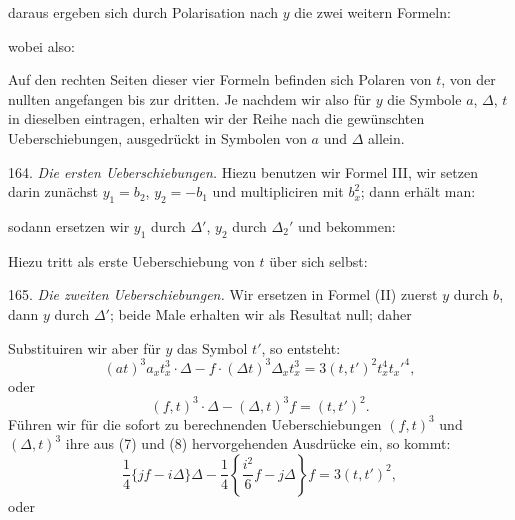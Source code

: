 daraus ergeben sich durch Polarisation nach $y$ die zwei weitern Formeln:





wobei also:


Auf den rechten Seiten dieser vier Formeln befinden sich Polaren von $t$, von der nullten angefangen bis zur dritten. Je nachdem wir also für $y$ die Symbole $a$, $\Delta$, $t$ in dieselben eintragen, erhalten wir der Reihe nach die gewünschten Ueberschiebungen, ausgedrückt in Symbolen von $a$ und $\Delta$ allein.

164. \textit{Die ersten Ueberschiebungen.} Hiezu benutzen wir Formel III, wir setzen darin zunächst $y_1 = b_2$, $y_2 = -b_1$ und multipliciren mit $b_x^2$; dann erhält man:


sodann ersetzen wir $y_1$ durch $\Delta'$, $y_2$ durch $\Delta_2'$ und bekommen:


Hiezu tritt als erste Ueberschiebung von $t$ über sich selbst:


165. \textit{Die zweiten Ueberschiebungen.} Wir ersetzen in Formel (II) zuerst $y$ durch $b$, dann $y$ durch $\Delta'$; beide Male erhalten wir als Resultat null; daher



Substituiren wir aber für $y$ das Symbol $t'$, so entsteht:
\[
(at)^3 a_x t_x^3 \cdot \Delta - f\cdot(\Delta t)^3 \Delta_x t_x^3 = 3(t,t')^2 t_x^4 t_x'^4,
\]
oder
\[
(f,t)^3 \cdot \Delta - (\Delta,t)^3 f = (t,t')^2.
\]
Führen wir für die sofort zu berechnenden Ueberschiebungen $(f,t)^3$ und $(\Delta,t)^3$ ihre aus (7) und (8) hervorgehenden Ausdrücke ein, so kommt:
\[
\frac{1}{4}\{jf - i\Delta\}\Delta - \frac{1}{4}\left\{\frac{i^2}{6} f - j\Delta\right\}f = 3(t,t')^2,
\]
oder

